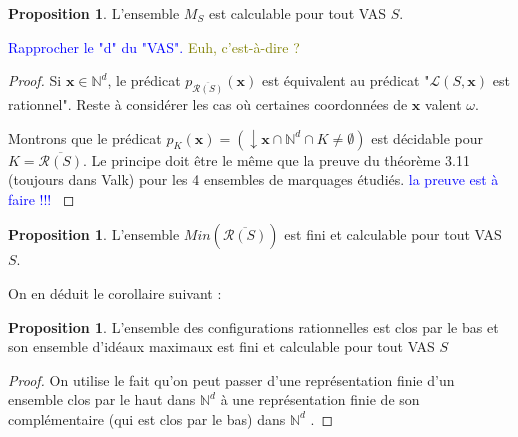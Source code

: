 \documentclass[a4paper,final]{article}
\theoremstyle{definition}
\newtheorem{Proposition}[Theorem]{Proposition}
\newcommand{\alain}[1]{\textcolor{blue}{#1}}
\newcommand{\lucas}[1]{\textcolor{olive}{#1}}
\newcommand{\Min}{\textit{Min}}
\newcommand{\N}{\ensuremath{\mathbb{N}}}
\newcommand{\lang}{\ensuremath{\mathcal{L}}}
\newcommand{\vect}[1]{\ensuremath{\mathbf{#1}}}
\newcommand{\inirat}{\mathcal{R}}
\begin{document}
\begin{Proposition}\label{minimaux}
L'ensemble $M_S$ est calculable pour tout VAS $S$.

\alain{Rapprocher le "d" du "VAS".}
\lucas{Euh, c'est-à-dire ?}
\end{Proposition}

\begin{proof}
Si $\vect{x}\in\N^d$, le prédicat $p_{\overline{\inirat(S)}}(\vect{x})$ est équivalent au prédicat "$\lang(S,\vect{x})$ est rationnel".
Reste à considérer les cas où certaines coordonnées de $\vect{x}$ valent $\omega$.

Montrons que le prédicat $p_K(\vect{x})=(\downarrow \vect{x} \cap \N^d \cap K \neq \emptyset)$ est décidable pour $K=\overline{\inirat(S)}$. Le principe doit être le même que la preuve du théorème 3.11 (toujours dans Valk) pour les 4 ensembles de marquages étudiés.
\alain{la preuve est à faire !!! }
\end{proof}

\begin{Proposition}\label{minimaux}
L'ensemble $\Min(\overline{\inirat(S)})$ est fini et calculable pour tout VAS $S$.
\end{Proposition}

On en déduit le corollaire suivant :

\begin{Proposition}\label{maximaux}
L'ensemble des configurations rationnelles est clos par le bas et son ensemble d'idéaux maximaux est fini et calculable pour tout VAS $S$ 
\end{Proposition}

\begin{proof}
On utilise le fait qu'on peut passer d'une représentation finie d'un ensemble clos par le haut dans $\N^d$ à une représentation finie de son complémentaire (qui est clos par le bas) dans $\N^d$ \cite{GHKNS-til2020}.

\end{proof}
\end{document}
